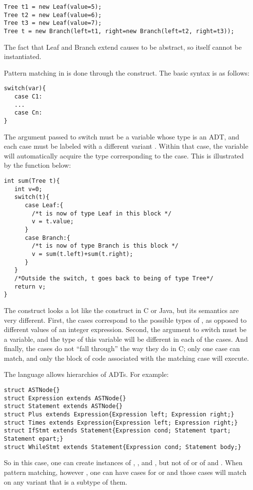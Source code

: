 \begin{lstlisting}
Tree t1 = new Leaf(value=5);
Tree t2 = new Leaf(value=6);
Tree t3 = new Leaf(value=7);
Tree t = new Branch(left=t1, right=new Branch(left=t2, right=t3));
\end{lstlisting}
The fact that Leaf and Branch extend  causes  to be abstract, so  itself cannot be instantiated.

Pattern matching in \Sk{} is done through the  construct. The basic syntax is as follows:
\begin{lstlisting}
switch(var){
   case C1:
   ...
   case Cn:
}
\end{lstlisting}
The argument  passed to switch must be a variable whose type is an ADT, and each case must be labeled with a different variant . Within that case, the variable  will automatically acquire the type corresponding to the case. This is illustrated by the function below:



\begin{lstlisting}
int sum(Tree t){
   int v=0;
   switch(t){
      case Leaf:{
        /*t is now of type Leaf in this block */
        v = t.value;
      }
      case Branch:{
        /*t is now of type Branch is this block */
        v = sum(t.left)+sum(t.right);
      }
   }
   /*Outside the switch, t goes back to being of type Tree*/
   return v;
}
\end{lstlisting}
The  construct looks a lot like the  construct in C or Java, but its semantics are very different. First, the cases correspond to the possible types of , as opposed to different values of an integer expression. Second, the argument to switch must be a variable, and the type of this variable will be different in each of the cases. And finally, the cases do not ``fall through'' the way they do in C; only one case can match, and only the block of code associated with the matching case will execute.

The language allows hierarchies of ADTs. For example:
\begin{lstlisting}
struct ASTNode{}
struct Expression extends ASTNode{}
struct Statement extends ASTNode{}
struct Plus extends Expression{Expression left; Expression right;}
struct Times extends Expression{Expression left; Expression right;}
struct IfStmt extends Statement{Expression cond; Statement tpart; Statement epart;}
struct WhileStmt extends Statement{Expression cond; Statement body;}
\end{lstlisting}
So in this case, one can create instances of , ,  and , but not of  or of  and . When pattern matching, however , one can have cases for  or  and those cases will match on any variant that is a subtype of them.

